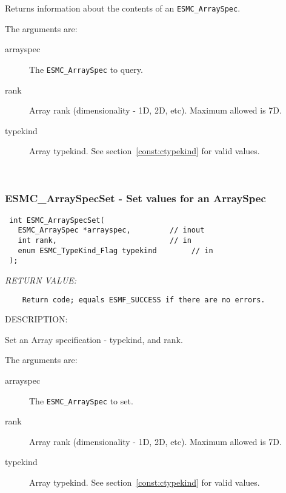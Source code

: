   
    Returns information about the contents of an {\tt ESMC\_ArraySpec}.
  
    The arguments are:
    \begin{description}
    \item[arrayspec]
      The {\tt ESMC\_ArraySpec} to query.
    \item[rank]
      Array rank (dimensionality - 1D, 2D, etc). Maximum allowed is 7D.
    \item[typekind]
      Array typekind. See section~\ref{const:ctypekind} for valid values.
    \end{description}
   
 
\mbox{}\hrulefill\ 
 
\subsubsection [ESMC\_ArraySpecSet] {ESMC\_ArraySpecSet - Set values for an ArraySpec}


  
\begin{verbatim} int ESMC_ArraySpecSet(
   ESMC_ArraySpec *arrayspec,         // inout 
   int rank,                          // in
   enum ESMC_TypeKind_Flag typekind        // in
 );\end{verbatim}{\em RETURN VALUE:}
\begin{verbatim}    Return code; equals ESMF_SUCCESS if there are no errors.\end{verbatim}
{\sf DESCRIPTION:\\ }


  
    Set an Array specification - typekind, and rank.
  
    The arguments are:
    \begin{description}
    \item[arrayspec]
      The {\tt ESMC\_ArraySpec} to set.
    \item[rank]
      Array rank (dimensionality - 1D, 2D, etc). Maximum allowed is 7D.
    \item[typekind]
      Array typekind. See section~\ref{const:ctypekind} for valid values.
    \end{description}
  
\setlength{\parskip}{\oldparskip}
\setlength{\parindent}{\oldparindent}
\setlength{\baselineskip}{\oldbaselineskip}
